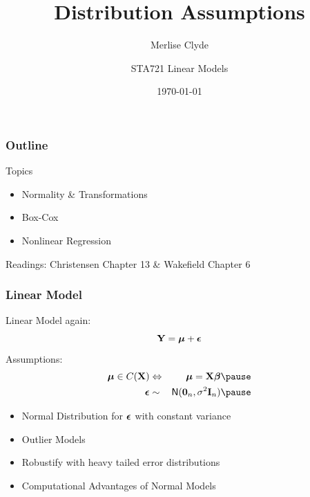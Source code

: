 \documentclass[handout]{beamer}
\title{Distribution Assumptions}
\subtitle{Merlise Clyde}
\author{STA721 Linear Models}
\institute{Duke University}
\date{\today}
\begin{document}
\maketitle

\begin{frame}\frametitle{Outline}
Topics
  \begin{itemize}
  \item Normality \& Transformations
  \item Box-Cox
  \item Nonlinear Regression
  \end{itemize}


Readings: Christensen  Chapter 13  \& Wakefield Chapter 6
\end{frame}
\begin{frame} \frametitle{ Linear Model}
Linear Model again:
 $$ \mathbf{Y} = \boldsymbol{\mu} + \boldsymbol{\epsilon} $$ \pause
Assumptions: \pause
\begin{eqnarray*}
   \mub \in C(\X) & \Leftrightarrow & \mub = \X \b \pause \\
   \eps  & \sim &  \N(\zero_n, \sigma^2 \I_n) \pause
\end{eqnarray*}
\begin{itemize}
\item Normal Distribution for $\boldsymbol{\epsilon}$ with constant variance \\
\item Outlier Models
\item Robustify with heavy tailed error distributions
\item Computational Advantages of Normal Models
\end{itemize}
\end{frame}
\end{document}

